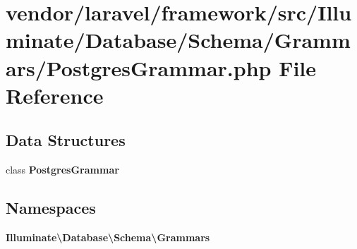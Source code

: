 \section{vendor/laravel/framework/src/\+Illuminate/\+Database/\+Schema/\+Grammars/\+Postgres\+Grammar.php File Reference}
\label{_schema_2_grammars_2_postgres_grammar_8php}
\subsection*{Data Structures}
\begin{DoxyCompactItemize}
\item 
class {\bf Postgres\+Grammar}
\end{DoxyCompactItemize}
\subsection*{Namespaces}
\begin{DoxyCompactItemize}
\item 
 {\bf Illuminate\textbackslash{}\+Database\textbackslash{}\+Schema\textbackslash{}\+Grammars}
\end{DoxyCompactItemize}
